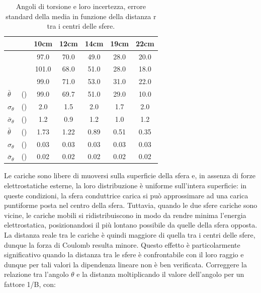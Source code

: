 \begin{table}[H]
\centering
\begin{tabular}{l l *{5}{S[table-format=3.2, table-number-alignment=center]}} 
\toprule
& & {\textbf{10cm}} & {\textbf{12cm}} & {\textbf{14cm}} & {\textbf{19cm}} & {\textbf{22cm}} \\
\midrule
& & 97.0 & 70.0 & 49.0 & 28.0 & 20.0 \\
& & 101.0 & 68.0 & 51.0 & 28.0 & 18.0 \\
& & 99.0 & 71.0 & 53.0 & 31.0 & 22.0 \\
\midrule
{\textbf{\boldmath$\bar{\theta}$}}         & {()}    & 99.0 & 69.7 & 51.0 & 29.0 & 10.0 \\
{\textbf{\boldmath$\sigma_{\theta}$}}      & {()}    & 2.0  & 1.5 & 2.0 & 1.7 & 2.0 \\
{\textbf{\boldmath$\bar{\sigma}_{\theta}$}} & {()}    & 1.2  & 0.9 & 1.2 & 1.0 & 1.2 \\
\midrule
{\textbf{\boldmath$\bar{\theta}$}}         & {()}    & 1.73 & 1.22 & 0.89 & 0.51 & 0.35 \\
{\textbf{\boldmath$\sigma_{\theta}$}}      & {()}    & 0.03  & 0.03 & 0.03 & 0.03 & 0.03 \\
{\textbf{\boldmath$\bar{\sigma}_{\theta}$}} & {()}    & 0.02  & 0.02 & 0.02 & 0.02 & 0.02 \\
\bottomrule
\end{tabular}
\caption{Angoli di torsione e loro incertezza, errore standard della media in funzione della distanza r tra i centri delle sfere.}
\label{tab:distanza}
\end{table}

Le cariche sono libere di muoversi sulla superficie della sfera e, in assenza di forze elettrostatiche esterne, la loro distribuzione è uniforme sull'intera superficie: in queste condizioni, la sfera conduttrice carica si può approssimare ad una carica puntiforme posta nel centro della sfera. Tuttavia, quando le due sfere cariche sono vicine, le cariche mobili si
ridistribuiscono in modo da rendre minima l’energia elettrostatica, posizionandosi il più lontano possibile da quelle della sfera opposta. 
La distanza reale tra le cariche è quindi maggiore di quella tra i centri delle sfere, dunque la forza di Coulomb resulta minore. Questo effetto è particolarmente significativo quando la distanza tra le sfere è confrontabile con il loro raggio e dunque per tali valori la dipendenza lineare non è ben verificata.
\newpage
Correggere la relazione tra l’angolo $\theta$ e la distanza moltiplicando il valore dell’angolo per un fattore 1/B, con:

